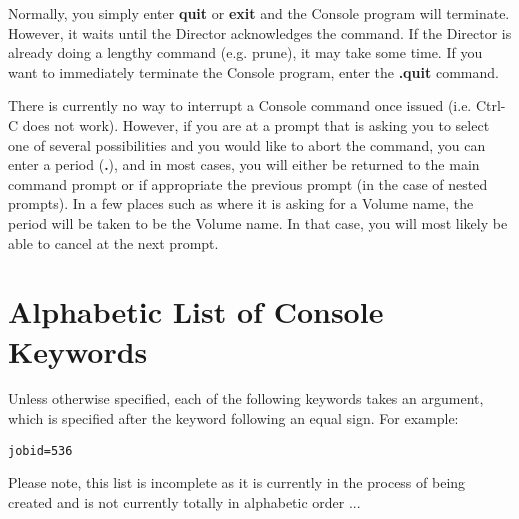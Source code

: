 Normally, you simply enter {\bf quit} or {\bf exit} and the Console program
will terminate. However, it waits until the Director acknowledges the command.
If the Director is already doing a lengthy command (e.g. prune), it may take
some time. If you want to immediately terminate the Console program, enter the
{\bf .quit} command. 

There is currently no way to interrupt a Console command once issued (i.e.
Ctrl-C does not work). However, if you are at a prompt that is asking you to
select one of several possibilities and you would like to abort the command,
you can enter a period ({\bf .}), and in most cases, you will either be
returned to the main command prompt or if appropriate the previous prompt (in
the case of nested prompts). In a few places such as where it is asking for a
Volume name, the period will be taken to be the Volume name. In that case, you
will most likely be able to cancel at the next prompt. 

\label{keywords}
\section{Alphabetic List of Console Keywords}
Unless otherwise specified, each of the following keywords
takes an argument, which is specified after the keyword following
an equal sign. For example:

\begin{verbatim}
jobid=536
\end{verbatim}

Please note, this list is incomplete as it is currently in
the process of being created and is not currently totally in 
alphabetic
order ...

